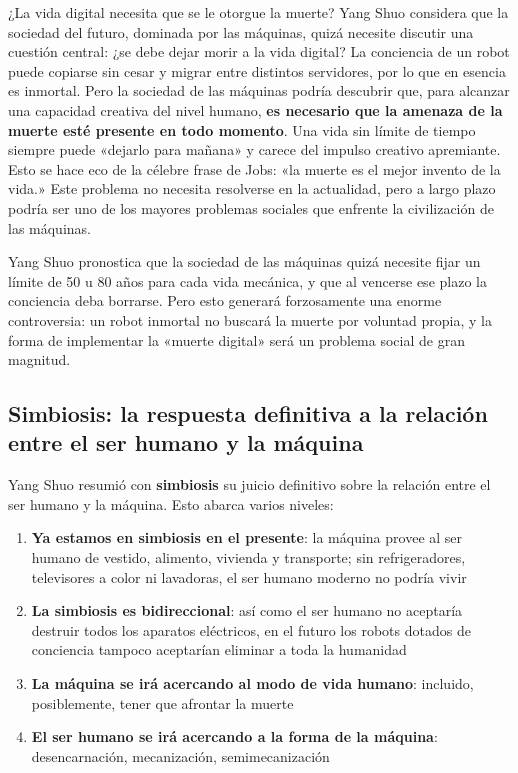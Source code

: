 \begin{warningbox}{¿La vida digital necesita que se le otorgue la muerte?}
Yang Shuo considera que la sociedad del futuro, dominada por las máquinas, quizá necesite discutir una cuestión central: ¿se debe dejar morir a la vida digital? La conciencia de un robot puede copiarse sin cesar y migrar entre distintos servidores, por lo que en esencia es inmortal. Pero la sociedad de las máquinas podría descubrir que, para alcanzar una capacidad creativa del nivel humano, \textbf{es necesario que la amenaza de la muerte esté presente en todo momento}. Una vida sin límite de tiempo siempre puede «dejarlo para mañana» y carece del impulso creativo apremiante. Esto se hace eco de la célebre frase de Jobs: «la muerte es el mejor invento de la vida.» Este problema no necesita resolverse en la actualidad, pero a largo plazo podría ser uno de los mayores problemas sociales que enfrente la civilización de las máquinas.
\end{warningbox}

Yang Shuo pronostica que la sociedad de las máquinas quizá necesite fijar un límite de 50 u 80 años para cada vida mecánica, y que al vencerse ese plazo la conciencia deba borrarse. Pero esto generará forzosamente una enorme controversia: un robot inmortal no buscará la muerte por voluntad propia, y la forma de implementar la «muerte digital» será un problema social de gran magnitud.

\subsection{Simbiosis: la respuesta definitiva a la relación entre el ser humano y la máquina}

Yang Shuo resumió con \textbf{simbiosis} su juicio definitivo sobre la relación entre el ser humano y la máquina. Esto abarca varios niveles:

\begin{enumerate}
    \item \textbf{Ya estamos en simbiosis en el presente}: la máquina provee al ser humano de vestido, alimento, vivienda y transporte; sin refrigeradores, televisores a color ni lavadoras, el ser humano moderno no podría vivir
    \item \textbf{La simbiosis es bidireccional}: así como el ser humano no aceptaría destruir todos los aparatos eléctricos, en el futuro los robots dotados de conciencia tampoco aceptarían eliminar a toda la humanidad
    \item \textbf{La máquina se irá acercando al modo de vida humano}: incluido, posiblemente, tener que afrontar la muerte
    \item \textbf{El ser humano se irá acercando a la forma de la máquina}: desencarnación, mecanización, semimecanización
\end{enumerate}

